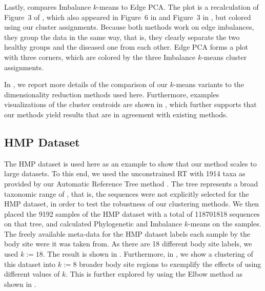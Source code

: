 Lastly,  compares Imbalance $k$-means to Edge PCA.
The plot is a recalculation of Figure~3 of \cite{Matsen2011b}, which also appeared in Figure~6 in \cite{Matsen2011a}
and Figure~3 in \cite{Srinivasan2012},
but colored using our cluster assignments.
Because both methods work on edge imbalances, they group the data in the same way,
that is, they clearly separate the two healthy groups and the diseased one from each other.
Edge PCA forms a plot with three corners, which are colored by the three Imbalance $k$-means cluster assignments.

In , we report more details of the comparison of our $k$-means variants
to the dimensionality reduction methods used here.
Furthermore, examples visualizations of the cluster centroids are shown in ,
which further supports that our methods yield results that are in agreement with existing methods.


\subsection{HMP Dataset}
\label{ch:Clustering:sec:Results:sub:HMPDataset}

The \ac{HMP} dataset is used here as an example to show that our method scales to large datasets.
To this end, we used the unconstrained  \ac{RT} with \num{1 914} taxa
as provided by our Automatic Reference Tree method \cite{Czech2018}.
The tree represents a broad taxonomic range of ,
that is, the sequences were not explicitly selected for the \ac{HMP} dataset,
in order to test the robustness of our clustering methods.
We then placed the \num{9 192} samples of the \ac{HMP} dataset with a total of \num{118 701 818} sequences
on that tree, and calculated Phylogenetic and Imbalance $k$-means on the samples.
The freely available meta-data for the \ac{HMP} dataset labels each sample by the body site were it was
taken from.
As there are \num{18} different body site labels, we used $k:=18$.
The result is shown in .
Furthermore, in ,
we show a clustering of this dataset into $k:=8$ broader body site regions
to exemplify the effects of using different values of $k$.
This is further explored by using the Elbow method as shown in .


